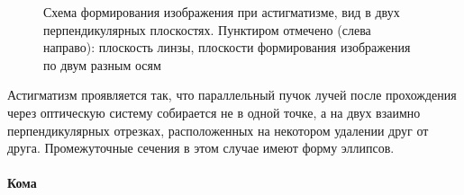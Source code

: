 \begin{wrapfigure}[13]{r}{0.4\tw}
    \caption{Схема формирования изображения при астигматизме, вид в двух перпендикулярных плоскостях. Пунктиром отмечено (слева направо): плоскость линзы, плоскости формирования изображения по двум разным осям}
    \label{pic:astigmatism}
\end{wrapfigure}
Астигматизм проявляется так, что параллельный пучок лучей после прохождения через оптическую систему собирается не в одной точке, а на двух взаимно перпендикулярных отрезках, расположенных на некотором удалении друг от друга. Промежуточные сечения в этом случае имеют форму эллипсов.

\paragraph{Кома}

